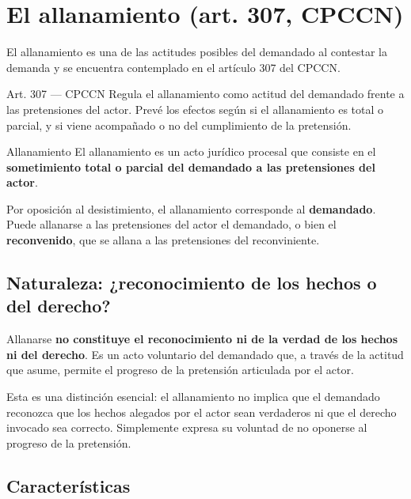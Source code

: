 \documentclass[12pt,oneside]{book}
\begin{document}
\section{El allanamiento (art. 307, CPCCN)}

El allanamiento es una de las actitudes posibles del demandado al contestar la demanda y se encuentra contemplado en el artículo 307 del CPCCN.

\begin{articulo}{Art. 307 --- CPCCN}
Regula el allanamiento como actitud del demandado frente a las pretensiones del actor. Prevé los efectos según si el allanamiento es total o parcial, y si viene acompañado o no del cumplimiento de la pretensión.
\end{articulo}

\begin{definition}{Allanamiento}
El allanamiento es un acto jurídico procesal que consiste en el \textbf{sometimiento total o parcial del demandado a las pretensiones del actor}.
\end{definition}

Por oposición al desistimiento, el allanamiento corresponde al \textbf{demandado}. Puede allanarse a las pretensiones del actor el demandado, o bien el \textbf{reconvenido}, que se allana a las pretensiones del reconviniente.

\subsection{Naturaleza: ¿reconocimiento de los hechos o del derecho?}

\begin{important}
Allanarse \textbf{no constituye el reconocimiento ni de la verdad de los hechos ni del derecho}. Es un acto voluntario del demandado que, a través de la actitud que asume, permite el progreso de la pretensión articulada por el actor.
\end{important}

Esta es una distinción esencial: el allanamiento no implica que el demandado reconozca que los hechos alegados por el actor sean verdaderos ni que el derecho invocado sea correcto. Simplemente expresa su voluntad de no oponerse al progreso de la pretensión.

\subsection{Características}
\end{document}
